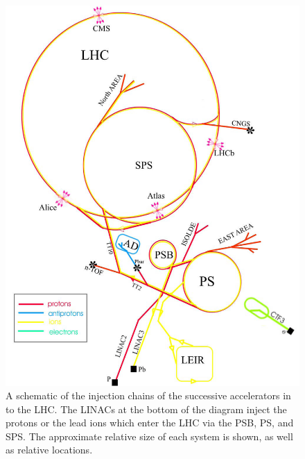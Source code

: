 \begin{figure}[!Hh]
       \centering
       \includegraphics[scale=0.1]{Figures/PSnew.jpg} 
       \caption[Schematic of the LHC injection chain system.]{A schematic of the injection chains of the successive accelerators in to the LHC.  The LINACs at the bottom of the diagram inject the protons or the lead ions which enter the LHC via the PSB, PS, and SPS.  The approximate relative size of each system is shown, as well as relative locations.}
\label{figapp:LHCinjection}
\end{figure}


